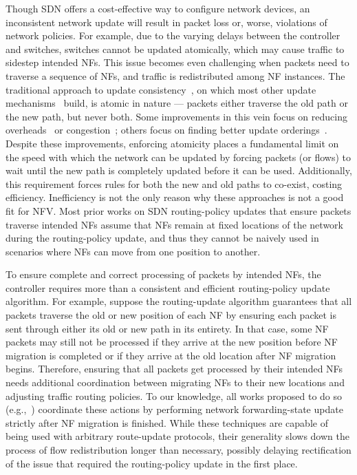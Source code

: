 Though SDN offers a cost-effective way to configure network devices, an inconsistent network update will result in packet loss or, worse, violations of network policies. For example, due to the varying delays between the controller and switches, switches cannot be updated atomically, which may cause traffic to sidestep intended NFs. This issue becomes even challenging when packets need to traverse a sequence of NFs, and traffic is redistributed among NF instances. The traditional approach to update consistency~\cite{CU}, on which most other update mechanisms~\cite{swan,dionysus,espres,zupdate,incrementalcu,timedcu} build, is atomic in nature --- packets either traverse the old path or the new path, but never both.  Some improvements in this vein focus on
reducing overheads~\cite{DecentralizedCU,incrementalcu,flip} or congestion~\cite{zupdate,swan}; others focus on finding better update orderings~\cite{espres,tango,dionysus,tsu, gnu, lfupdate, dlb}.  Despite these
improvements, enforcing atomicity places a fundamental limit on the speed with which the network can be updated by forcing packets (or flows) to wait until the new path is completely updated before it can
be used. Additionally, this requirement forces rules for both the new and old paths to co-exist, costing efficiency.  Inefficiency is not the only reason why these approaches is not a good fit for NFV. Most prior works on SDN routing-policy updates that ensure packets traverse intended NFs assume that NFs remain at fixed locations of the network during the routing-policy update, and thus they cannot be naively used in scenarios where NFs can move from one position to another. 


To ensure complete and correct processing of packets by intended NFs, the controller requires more than a consistent and efficient routing-policy update algorithm. For example, suppose the routing-update algorithm guarantees that all packets traverse the old or new position of each NF by ensuring each packet is sent through either its old or new path in its entirety. In that case, some NF packets may still not be processed if they arrive at the new position before NF migration is completed or if they arrive at the old location after NF migration begins. Therefore, ensuring that all packets get processed by their intended NFs needs additional coordination between migrating NFs to their new locations and adjusting traffic routing policies.  To our knowledge, all works proposed
to do so (e.g.,~\cite{opennf, split, transfer, swingstate}) coordinate
these actions by performing network forwarding-state update strictly
after NF migration is finished.  While these techniques are capable of
being used with arbitrary route-update protocols, their generality
slows down the process of flow redistribution longer than necessary,
possibly delaying rectification of the issue that required the
routing-policy update in the first place.


